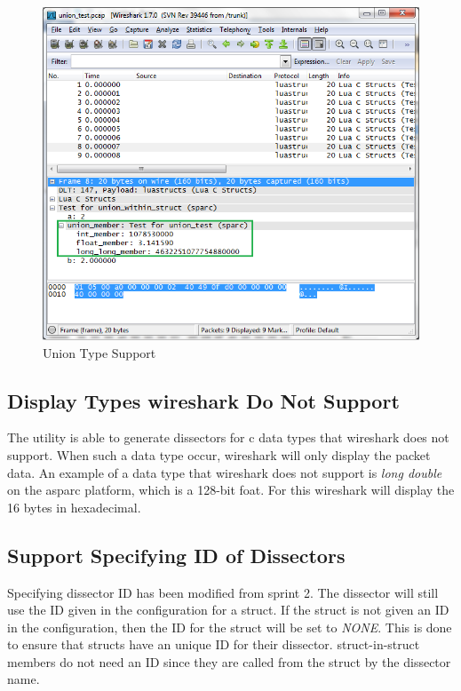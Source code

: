 \begin{figure}[htbp]
	\center
	\includegraphics[width=\textwidth]{./sprints/img/wireshark_union}
	\caption{Union Type Support\label{fig:wsunion}}
\end{figure}



\subsection{Display Types \Gls{wireshark} Do Not Support}
The \gls{utility} is able to generate \glspl{dissector} for \Gls{c} data types that \Gls{wireshark} 
does not support. When such a data type occur, \Gls{wireshark} will only display the
\gls{packet} data. An example of a data type that \Gls{wireshark} does not 
support is \emph{long double} on the \gls{asparc} platform, which is a 128-bit foat. 
For this \Gls{wireshark} will display the 16 bytes in \gls{hexadecimal}.

\subsection{Support Specifying ID of Dissectors}
Specifying \gls{dissector} ID has been modified from sprint 2. The \gls{dissector} will 
still use the ID given in the configuration for a \gls{struct}. If the \gls{struct} is not 
given an ID in the configuration, then the ID for the \gls{struct} will be set to 
\emph{NONE}. This is done to ensure that \glspl{struct} have an unique ID for their 
\gls{dissector}. \Gls{struct}-in-\gls{struct} \glspl{member} do not need an ID since they are called 
from the \gls{struct} by the \gls{dissector} name.

